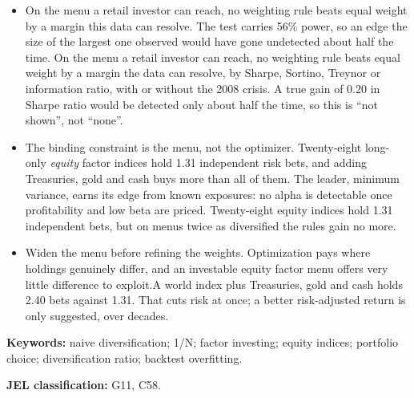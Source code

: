 \documentclass[12pt,letterpaper]{article}
\newcommand{\quita}[1]{{\color{quitarc}#1}}
\newcommand{\nuevo}[1]{{\color{nuevoc}#1}}
\begin{document}
\begin{itemize}\setlength{\itemsep}{6pt}\setlength{\parskip}{0pt}
\item \quita{On the menu a retail investor can reach, no weighting rule beats equal weight by a margin
      this data can resolve. The test carries 56\% power, so an edge the size of the largest
      one observed would have gone undetected about half the time.}
      \nuevo{On the menu a retail investor can reach, no weighting rule beats equal weight by a
      margin the data can resolve, by Sharpe, Sortino, Treynor or information ratio, with or
      without the 2008 crisis. A true gain of 0.20 in Sharpe ratio would be detected only about
      half the time, so this is ``not shown'', not ``none''.}
\item \quita{The binding constraint is the menu, not the optimizer. Twenty-eight long-only
      \emph{equity} factor indices hold 1.31 independent risk bets, and adding Treasuries,
      gold and cash buys more than all of them.}
      \nuevo{The leader, minimum variance, earns its edge from known exposures: no alpha is
      detectable once profitability and low beta are priced. Twenty-eight equity indices hold 1.31
      independent bets, but on menus twice as diversified the rules gain no more.}
\item \quita{Widen the menu before refining the weights. Optimization pays where holdings
      genuinely differ, and an investable equity factor menu offers very little difference
      to exploit.}\nuevo{A world index plus Treasuries, gold and cash holds 2.40 bets against 1.31.
      That cuts risk at once; a better risk-adjusted return is only suggested, over decades.}
\end{itemize}

\vspace{12pt}
\noindent\textbf{Keywords:} naive diversification; 1/N; factor investing; equity
indices; portfolio choice; diversification ratio; backtest overfitting.

\noindent\textbf{JEL classification:} G11, C58.

\clearpage

\end{document}
